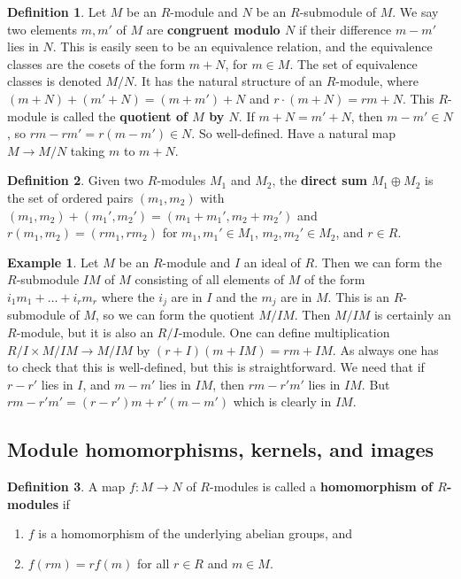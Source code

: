 \documentclass{article}
\newcommand{\rb}[1]{\left( #1 \right)}
\theoremstyle{definition}\newtheorem{definition}{Definition}[subsection]
\theoremstyle{definition}\newtheorem{remark}[definition]{Remark}
\theoremstyle{definition}\newtheorem*{example}{Example}
\theoremstyle{definition}\newtheorem*{note}{Note}
\begin{document}
\begin{definition}
Let $ M $ be an $ R $-module and $ N $ be an $ R $-submodule of $ M $. We say two elements $ m, m' $ of $ M $ are \textbf{congruent modulo $ N $} if their difference $ m - m' $ lies in $ N $. This is easily seen to be an equivalence relation, and the equivalence classes are the cosets of the form $ m + N $, for $ m \in M $. The set of equivalence classes is denoted $ M / N $. It has the natural structure of an $ R $-module, where $ \rb{m + N} + \rb{m' + N} = \rb{m + m'} + N $ and $ r \cdot \rb{m + N} = rm + N $. This $ R $-module is called the \textbf{quotient of $ M $ by $ N $}. If $ m + N = m' + N $, then $ m - m' \in N $, so $ rm - rm' = r\rb{m - m'} \in N $. So well-defined. Have a natural map $ M \to M / N $ taking $ m $ to $ m + N $.
\end{definition}

\begin{definition}
Given two $ R $-modules $ M_1 $ and $ M_2 $, the \textbf{direct sum} $ M_1 \oplus M_2 $ is the set of ordered pairs $ \rb{m_1, m_2} $ with $ \rb{m_1, m_2} + \rb{m_1', m_2'} = \rb{m_1 + m_1', m_2 + m_2'} $ and $ r\rb{m_1, m_2} = \rb{rm_1, rm_2} $ for $ m_1, m_1' \in M_1 $, $ m_2, m_2' \in M_2 $, and $ r \in R $.
\end{definition}

\begin{example}
Let $ M $ be an $ R $-module and $ I $ an ideal of $ R $. Then we can form the $ R $-submodule $ IM $ of $ M $ consisting of all elements of $ M $ of the form $ i_1m_1 + \dots + i_rm_r $ where the $ i_j $ are in $ I $ and the $ m_j $ are in $ M $. This is an $ R $-submodule of $ M $, so we can form the quotient $ M / IM $. Then $ M / IM $ is certainly an $ R $-module, but it is also an $ R / I $-module. One can define multiplication $ R / I \times M / IM \to M / IM $ by $ \rb{r + I}\rb{m + IM} = rm + IM $. As always one has to check that this is well-defined, but this is straightforward. We need that if $ r - r' $ lies in $ I $, and $ m - m' $ lies in $ IM $, then $ rm - r'm' $ lies in $ IM $. But $ rm - r'm' = \rb{r - r'}m + r'\rb{m - m'} $ which is clearly in $ IM $.
\end{example}

\subsection{Module homomorphisms, kernels, and images}

\begin{definition}
A map $ f : M \to N $ of $ R $-modules is called a \textbf{homomorphism of $ R $-modules} if
\begin{enumerate}
\item $ f $ is a homomorphism of the underlying abelian groups, and
\item $ f\rb{rm} = rf\rb{m} $ for all $ r \in R $ and $ m \in M $.
\end{enumerate}
\end{definition}
\end{document}
